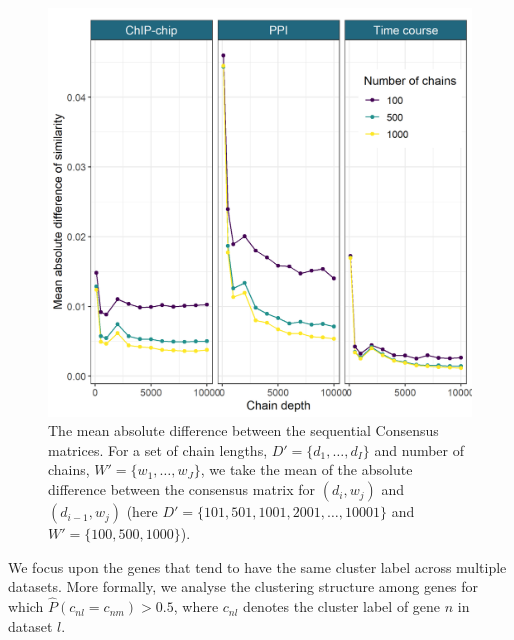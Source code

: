 \documentclass{bmcart}
\begin{document}
\begin{figure}
	\centering
	\includegraphics[scale=0.7]{./SupplementaryMaterial/Images/Yeast/EnsembleChoicePlotAlt.png}
	\caption{The mean absolute difference between the sequential Consensus matrices. For a set of chain lengths, $D'=\{d_1, \ldots, d_I\}$ and number of chains, $W'=\{w_1, \ldots, w_J\}$, we take the mean of the absolute difference between the consensus matrix for $(d_i, w_j)$ and $(d_{i-1}, w_{j})$ (here $D'=\{101, 501, 1001, 2001, \ldots, 10001\}$ and $W'=\{100, 500, 1000\}$). 
	}
	\label{fig:ensembleChoice}
\end{figure}

We focus upon the genes that tend to have the same cluster label across multiple datasets. More formally, we analyse the clustering structure among genes for which $\hat{P}(c_{nl} = c_{nm}) > 0.5$, where $c_{nl}$ denotes the cluster label of gene $n$ in dataset $l$.
\end{document}
